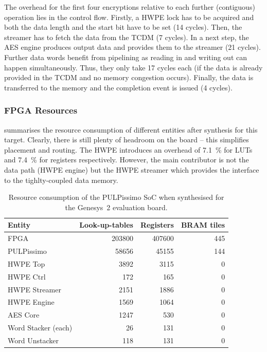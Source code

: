 \documentclass[a4paper, 12pt]{article}
\begin{document}
The overhead for the first four encryptions relative to each further (contiguous) operation lies in the control flow. Firstly, a HWPE lock has to be acquired and both the data length and the start bit have to be set (14 cycles). Then, the streamer has to fetch the data from the TCDM (7 cycles). In a next step, the AES engine produces output data and provides them to the streamer (21 cycles). Further data words benefit from pipelining as reading in and writing out can happen simultaneously. Thus, they only take 17 cycles each (if the data is already provided in the TCDM and no memory congestion occurs). Finally, the data is transferred to the memory and the completion event is issued (4 cycles). 

\subsubsection{FPGA Resources}

 summarises the resource consumption of different entities after synthesis for this target. Clearly, there is still plenty of headroom on the board -- this simplifies placement and routing. The HWPE introduces an overhead of \SI{7.1}{\percent} for LUTs and \SI{7.4}{\percent} for registers respectively. However, the main contributor is not the data path (HWPE engine) but the HWPE streamer which provides the interface to the tighlty-coupled data memory.

\begin{table}[h]
    \centering
    \begin{tabular}{l|r r r}
        \toprule
        Entity &  Look-up-tables & Registers & BRAM tiles \\
        \midrule
		FPGA &  203800 &  407600 &  445 \\
		\hspace{2mm}PULPissimo & 58656 & 45155 & 144 \\ 
		\hspace{4mm}HWPE Top & 3892 & 3115 & 0 \\ 
		\hspace{6mm}HWPE Ctrl & 172 & 165 & 0 \\ 
		\hspace{6mm}HWPE Streamer & 2151 & 1886 & 0 \\ 
		\hspace{6mm}HWPE Engine & 1569 & 1064 & 0 \\ 
		\hspace{8mm}AES Core & 1247 & 530 & 0 \\ 
		\hspace{8mm}Word Stacker (each) & 26 & 131 & 0 \\ 
		\hspace{8mm}Word Unstacker & 118 & 131 & 0 \\
        \bottomrule
    \end{tabular}
	\caption{Resource consumption of the PULPissimo SoC when synthesised for the Genesys~2 evaluation board.}
	\label{tab:results-genesys}
\end{table}
\end{document}

